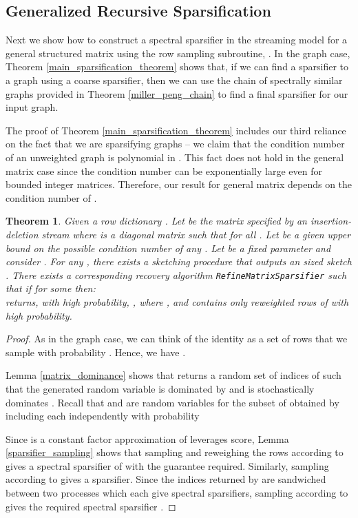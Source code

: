 \documentclass[11pt]{article}
\newtheorem{theorem}{Theorem}
\begin{document}
\subsection{Generalized Recursive Sparsification}
\label{sec:sub:gen:sparse}

Next we show how to construct a spectral sparsifier in the streaming model for a general
structured matrix using the row sampling subroutine, .
In the graph case, Theorem \ref{main_sparsification_theorem} shows
that, if we can find a sparsifier to a graph  using a coarse sparsifier,
then we can use the chain of spectrally similar graphs provided
in Theorem \ref{miller_peng_chain} to find a final  sparsifier for our input graph.

The proof of Theorem \ref{main_sparsification_theorem} includes our third reliance on the fact that we are sparsifying graphs -- we claim that the condition number of an unweighted
graph is polynomial in . This fact does not hold in the general matrix case since the condition number can be exponentially large even for bounded integer matrices. Therefore,
our result for general matrix depends on the condition number of . 


\begin{theorem}\label{refinement_unweighted_matrix} Given a row
dictionary . Let 
be the matrix specified by an insertion-deletion stream where 
is a diagonal matrix such that  for all . Let  be a given upper bound on the possible condition number of any .
Let  be a fixed parameter and consider .
For any , there exists a sketching procedure  that outputs an  sized sketch . There exists a corresponding recovery algorithm \texttt{RefineMatrixSparsifier} such that if  for some  then:\\



returns, with high probability, ,
where ,
and  contains only 
reweighted rows of  with high probability. \end{theorem}

\begin{proof} As in the graph case, we can think of the identity  as a set of rows that we sample with probability
. Hence, we have .

Lemma \ref{matrix_dominance} shows that 
returns a random set of indices of  such that the generated random variable is
dominated by  and is stochastically dominates . Recall that   and  are random variables for the subset
of  obtained by including each  independently
with probability 

Since  is a constant factor approximation of
leverages score, Lemma \ref{sparsifier_sampling} shows that sampling and reweighing the rows according
to  gives a spectral
sparsifier of  with the guarantee required. Similarly, sampling
according to  gives a sparsifier. Since the indices
returned by \textbf{} are sandwiched
between two processes which each give spectral sparsifiers, sampling according
to  gives
the required spectral sparsifier \cite{KP12}.
\end{proof}
\end{document}
